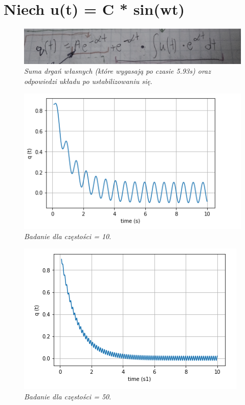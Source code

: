 \documentclass[12pt,oneside,a4paper]{book} %
\begin{document}
\section{Niech u(t) = C * sin(wt)}


\begin{figure}[h]
\begin{center} 
\includegraphics[scale=0.5]{./images/001.PNG} 
\caption{\textit{Suma drgań własnych (które wygasają po czasie 5.93s) oraz odpowiedzi układu po ustabilizowaniu się}.\newline }
\label{rys:logoup}
\end{center}
\end{figure}


\begin{figure}[h]
\begin{center} 
\includegraphics[scale=0.8]{./images/czestosc=10.PNG} 
\caption{\textit{Badanie dla częstości = 10}.\newline }
\label{rys:logoup}
\end{center}
\end{figure}


\begin{figure}[h]
\begin{center} 
\includegraphics[scale=0.8]{./images/czestosc=50.PNG} 
\caption{\textit{Badanie dla częstości = 50}.\newline }
\label{rys:logoup}
\end{center}
\end{figure}
\end{document}
